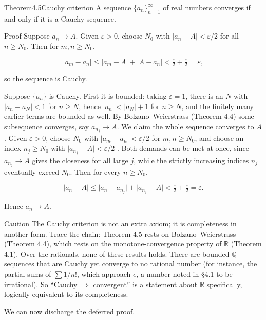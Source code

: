 \documentclass[a4paper,12pt,oneside]{memoir}
\begin{document}
\begin{envtheorem}{Theorem}{4.5}{Cauchy criterion}
A sequence \(\{a_{n}\}_{n=1}^{\infty}\) of real numbers converges if and only if it is a Cauchy sequence.
\end{envtheorem}
\begin{envproof}{Proof}{}{}
Suppose \(a_{n} \to A\). Given \(\varepsilon > 0\), choose \(N_{0}\) with \(\lvert a_{n} - A \rvert < \varepsilon/2\) for all \(n \ge N_{0}\). Then for \(m, n \ge N_{0}\),

\[ \lvert a_{m} - a_{n} \rvert \le \lvert a_{m} - A \rvert + \lvert A - a_{n} \rvert < \tfrac{\varepsilon}{2} + \tfrac{\varepsilon}{2} = \varepsilon, \]

so the sequence is Cauchy.

Suppose \(\{a_{n}\}\) is Cauchy. First it is bounded: taking \(\varepsilon = 1\), there is an \(N\) with \(\lvert a_{n} - a_{N} \rvert < 1\) for \(n \ge N\), hence \(\lvert a_{n} \rvert < \lvert a_{N} \rvert + 1\) for \(n \ge N\), and the finitely many earlier terms are bounded as well. By Bolzano–Weierstrass (Theorem 4.4) some subsequence converges, say \(a_{n_{j}} \to A\). We claim the whole sequence converges to \(A\). Given \(\varepsilon > 0\), choose \(N_{0}\) with \(\lvert a_{m} - a_{n} \rvert < \varepsilon/2\) for \(m, n \ge N_{0}\), and choose an index \(n_{j} \ge N_{0}\) with \(\lvert a_{n_{j}} - A \rvert < \varepsilon/2\) . Both demands can be met at once, since \(a_{n_{j}} \to A\) gives the closeness for all large \(j\), while the strictly increasing indices \(n_{j}\) eventually exceed \(N_{0}\). Then for every \(n \ge N_{0}\),

\[ \lvert a_{n} - A \rvert \le \lvert a_{n} - a_{n_{j}} \rvert + \lvert a_{n_{j}} - A \rvert < \tfrac{\varepsilon}{2} + \tfrac{\varepsilon}{2} = \varepsilon. \]

Hence \(a_{n} \to A\). \qedmark
\end{envproof}
\begin{envcaution}{Caution}{}{}
The Cauchy criterion is not an extra axiom; it is completeness in another form. Trace the chain: Theorem 4.5 rests on Bolzano–Weierstrass (Theorem 4.4), which rests on the monotone-convergence property of \(\mathbb{R}\) (Theorem 4.1). Over the rationals, none of these results holds. There are bounded \(\mathbb{Q}\)-sequences that are Cauchy yet converge to no rational number (for instance, the partial sums of \(\sum 1/n!\), which approach \(e\), a number noted in §4.1 to be irrational). So “Cauchy \(\Rightarrow\) convergent” is a statement about \(\mathbb{R}\) specifically, logically equivalent to its completeness.
\end{envcaution}
We can now discharge the deferred proof.
\end{document}
